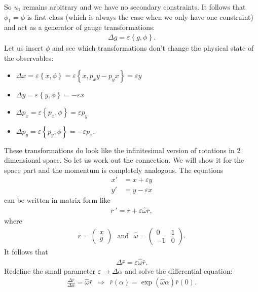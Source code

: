 So $u_1$ remains arbitrary and we have no secondary constraints. It follows that $\phi_1 = \phi$ is first-class (which is always the case when we only have one constraint) and act as a generator of gauge transformations:
\begin{align}
\Delta g = \varepsilon \left \{ g,\phi \right \}.
\end{align}
Let us insert $\phi$ and see which transformations don't change the physical state of the observables:
\begin{itemize}
\item $\Delta x = \varepsilon \left \{ x,\phi \right \} = \varepsilon \left \{ x,p_x y - p_y x \right \}= \varepsilon y$
\item $\Delta y = \varepsilon \left \{ y,\phi \right \} = - \varepsilon x$
\item $\Delta p_x = \varepsilon \left \{ p_x,\phi \right \} = \varepsilon p_y$
\item $\Delta p_y = \varepsilon \left \{ p_y,\phi \right \} = - \varepsilon p_x$.
\end{itemize}
These transformations do look like the infinitesimal version of rotations in $2$ dimensional space. So let us work out the connection. We will show it for the space part and the momentum is completely analogous.
The equations 
\begin{align}
x' &= x + \varepsilon y \\
y' &= y - \varepsilon x
\end{align}
can be written in matrix form like 
\begin{align}
\bar{r} \ ' = \bar{r} + \varepsilon \hat{\omega} \bar{r},
\end{align}
where
\begin{align}
\bar{r} = 
\begin{pmatrix}
    x \\
    y
\end{pmatrix} \ \ \ \text{and} \ \ \
\hat{\omega} = 
\begin{pmatrix}
    0 & 1 \\
    -1 & 0
\end{pmatrix}.
\end{align}
It follows that
\begin{align}
\Delta \bar{r} = \varepsilon \hat{\omega} \bar{r}.
\end{align}
Redefine the small parameter $\varepsilon \longrightarrow \Delta \alpha$ and solve the differential equation:
\begin{align}
\frac{\Delta \bar{r}}{\Delta \alpha} = \hat{\omega} \bar{r} \ \ \Longrightarrow \ \ \bar{r}(\alpha) = \exp(\hat{\omega} \alpha) \bar{r}(0).
\end{align}
